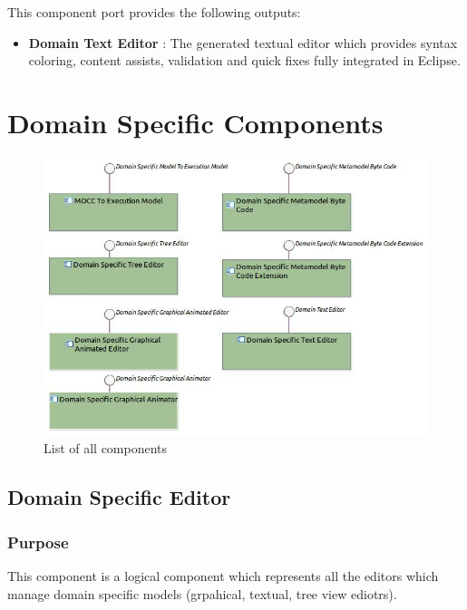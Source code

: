 \documentclass{gemoc} %
\begin{document}
This component port provides the following outputs:
\begin{itemize}
  \item \textbf{Domain Text Editor} :
The generated textual editor which provides syntax coloring, content assists, validation and quick fixes fully integrated in Eclipse.
\end{itemize}

\section{Domain Specific Components}
\begin{figure}[bt]
	\begin{center}
	\includegraphics*[trim=0.0cm 0.0cm 0cm 0.0cm, clip=true, width=1.0\linewidth]{../images/DomainSpecificComponents.jpg}
	\caption{List of all components}
	\label{fig:DomainSpecificComponentList}
	\end{center}
\end{figure}

\subsection{Domain Specific Editor}


\subsubsection{Purpose}
This component is a logical component which represents all the editors which manage domain specific models (grpahical, textual, tree view ediotrs).
\end{document}
